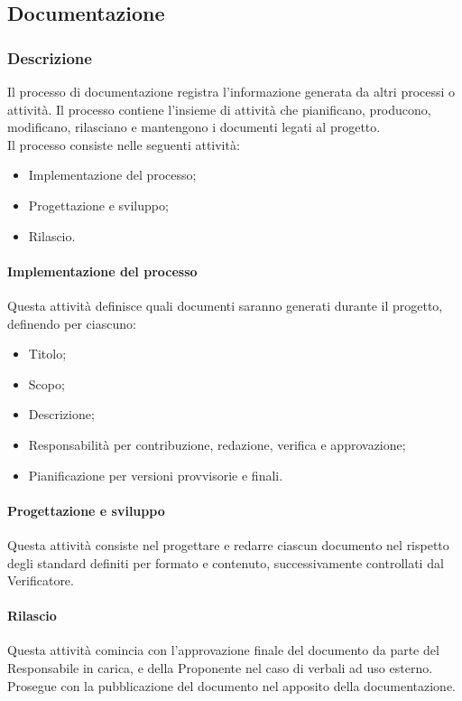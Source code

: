\subsection{Documentazione}

\subsubsection{Descrizione}
Il processo di documentazione registra l'informazione generata da altri processi o attività. Il processo contiene l'insieme di attività che pianificano, producono, modificano, rilasciano e mantengono i documenti legati al progetto.\\
Il processo consiste nelle seguenti attività:
\begin{itemize}
  \item Implementazione del processo;
  \item Progettazione e sviluppo;
  \item Rilascio.
\end{itemize}

\paragraph{Implementazione del processo}\label{implementazioneprocessodocumentazione}
Questa attività definisce quali documenti saranno generati durante il progetto, definendo per ciascuno:
\begin{itemize}
  \item Titolo;
  \item Scopo;
  \item Descrizione;
  \item Responsabilità per contribuzione, redazione, verifica e approvazione;
  \item Pianificazione per versioni provvisorie e finali.
\end{itemize}

\paragraph{Progettazione e sviluppo}
Questa attività consiste nel progettare e redarre ciascun documento nel rispetto degli standard definiti per formato e contenuto, successivamente controllati dal Verificatore.

\paragraph{Rilascio}
Questa attività comincia con l'approvazione finale del documento da parte del Responsabile in carica, e della Proponente nel caso di verbali ad uso esterno. Prosegue con la pubblicazione del documento nel  apposito della documentazione.

